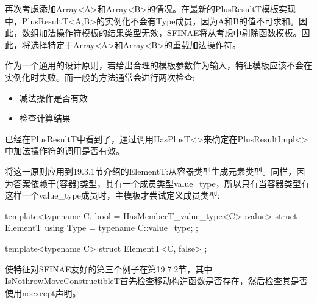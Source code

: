 再次考虑添加Array<A>和Array<B>的情况。在最新的PlusResultT模板实现中，PlusResultT<A,B>的实例化不会有Type成员，因为A和B的值不可求和。因此，数组加法操作符模板的结果类型无效，SFINAE将从考虑中剔除函数模板。因此，将选择特定于Array<A>和Array<B>的重载加法操作符。

作为一个通用的设计原则，若给出合理的模板参数作为输入，特征模板应该不会在实例化时失败。而一般的方法通常会进行两次检查:

\begin{itemize}
\item
减法操作是否有效

\item
检查计算结果
\end{itemize}

已经在PlusResultT中看到了，通过调用HasPlusT<>来确定在PlusResultImpl<>中加法操作符的调用是否有效。

将这一原则应用到19.3.1节介绍的ElementT:从容器类型生成元素类型。同样，因为答案依赖于(容器)类型，其有一个成员类型value\_type，所以只有当容器类型有这样一个value\_type成员时，主模板才尝试定义成员类型:

\begin{cpp}
template<typename C, bool = HasMemberT_value_type<C>::value>
struct ElementT {
	using Type = typename C::value_type;
};

template<typename C>
struct ElementT<C, false> {
};
\end{cpp}

使特征对SFINAE友好的第三个例子在第19.7.2节，其中IsNothrowMoveConstructibleT首先检查移动构造函数是否存在，然后检查其是否使用noexcept声明。













